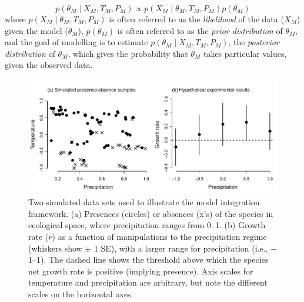 \begin{equation}
\label{eq:ex1_bayes}
	p\left (\theta_M \mid X_M,T_M,P_M \right ) \propto 
	p \left(X_M \mid \theta_M, T_M, P_M \right)
	p \left(\theta_M \right)
\end{equation}
where \(p\left(X_M \mid \theta_M, T_M, P_M \right)\) is often referred to as the \emph{likelihood} of the data (\(X_M\)) given the model (\(\theta_M\)), \(p\left(\theta_M \right)\) is often referred to as the \emph{prior distribution} of \(\theta_M\), and the goal of modelling is to estimate \(p\left (\theta_M \mid X_M,T_M,P_M \right )\), the \emph{posterior distribution} of \(\theta_M\), which gives the probability that \(\theta_M\) takes particular values, given the observed data.


\begin{figure}[tb]
	\includegraphics{ex1_sampling.pdf}
	\caption{Two simulated data sets used to illustrate the model integration framework.
	(a) Presences (circles) or absences (x's) of the species in ecological space, where precipitation ranges from 0--1.
	(b) Growth rate ($r$) as a function of manipulations to the precipitation regime (whiskers show $\pm$ 1 SE), with a larger range for precipitation (i.e., \(-\)1--1).
	The dashed line shows the threshold above which the species net growth rate is positive (implying presence).
	Axis scales for temperature and precipitation are arbitrary, but note the different scales on the horizontal axes.}
	\label{fig:ex1_sampling}
\end{figure}


